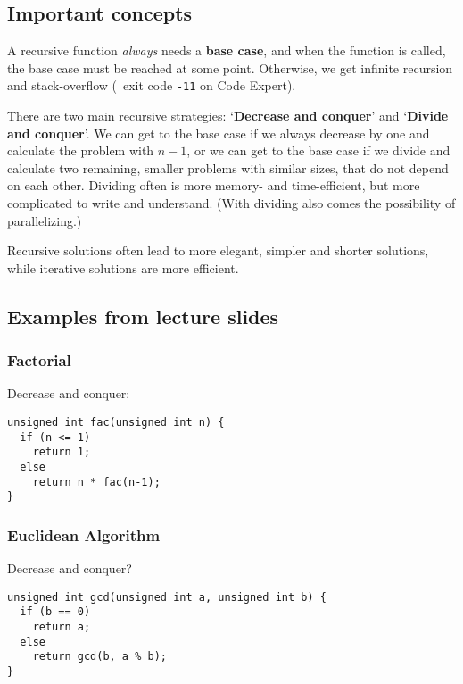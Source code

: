 \documentclass[fontsize=9pt, paper=landscape]{scrartcl}
\begin{document}
\begin{multicols}{2}
\subsection{Important concepts}

A recursive function \textit{always} needs a \textbf{base case}, and when the function is called, the base case must be reached at some point. Otherwise, we get infinite recursion and stack-overflow (\textrightarrow~exit code \texttt{-11} on \textsf{Code Expert}).

There are two main recursive strategies: `\textbf{Decrease and conquer}' and `\textbf{Divide and conquer}'. We can get to the base case if we always decrease by one and calculate the problem with \( n-1 \), or we can get to the base case if we divide and calculate two remaining, smaller problems with similar sizes, that do not depend on each other. Dividing often is more memory- and time-efficient, but more complicated to write and understand. (With dividing also comes the possibility of parallelizing.)

Recursive solutions often lead to more elegant, simpler and shorter solutions, while iterative solutions are more efficient.

\subsection{Examples from lecture slides}

\subsubsection{Factorial}

Decrease and conquer:

\begin{verbatim}
unsigned int fac(unsigned int n) {
  if (n <= 1)
    return 1;
  else
    return n * fac(n-1);
}
\end{verbatim}

\subsubsection{Euclidean Algorithm}

Decrease and conquer?

\begin{verbatim}
unsigned int gcd(unsigned int a, unsigned int b) {
  if (b == 0)
    return a;  
  else
    return gcd(b, a % b);
}
\end{verbatim}


\end{multicols}
\end{document}
